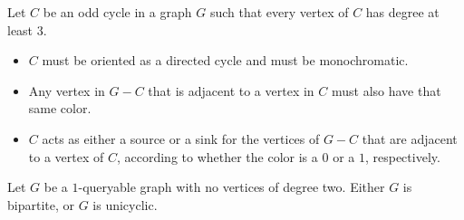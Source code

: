 \begin{corollary}\label{cor:odd cycles}Let $C$ be an odd cycle in a graph $G$ such that every vertex of $C$ has degree at least $3$.
	\begin{itemize}
		\item $C$ must be oriented as a directed cycle and must be monochromatic.
		\item Any vertex in $G-C$ that is adjacent to a vertex in $C$ must also have that same color.
		\item $C$ acts as either a source or a sink for the vertices of $G-C$ that are adjacent to a vertex of $C$, according to whether the color is a $0$ or a $1$, respectively.
	\end{itemize}
\end{corollary}

\begin{lemma}\label{lem:unicyclic}Let $G$ be a $1$-queryable graph with no vertices of degree two. Either $G$ is bipartite, or $G$ is unicyclic.
\end{lemma}
